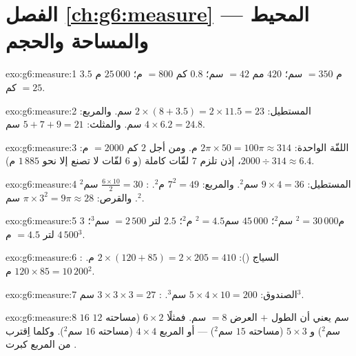 \section*{الفصل \ref{ch:g6:measure} --- المحيط والمساحة والحجم}

\begin{solution}{exo:g6:measure:1}
$3.5$ م $= 350$ سم؛ \quad $420$ مم $= 42$ سم؛ \quad
$0.8$ كم $= 800$ م؛ \quad $25\,000$ م $= 25$ كم.
\end{solution}

\begin{solution}{exo:g6:measure:2}
المستطيل: $2 \times (8 + 3.5) = 2 \times 11.5 = 23$ سم.
والمربع: $4 \times 6.2 = 24.8$ سم.
والمثلث: $5 + 7 + 9 = 21$ سم.
\end{solution}

\begin{solution}{exo:g6:measure:3}
اللفّة الواحدة: $2\pi \times 50 = 100\pi \approx 314$ م. ومن أجل $2$ كم
$= 2000$ م: $2000 \div 314 \approx 6.4$، إذن تلزم $7$ لفّات كاملة
(و $6$ لفّات لا تصنع إلا نحو $1\,885$ م).
\end{solution}

\begin{solution}{exo:g6:measure:4}
المستطيل: $9 \times 4 = 36$ سم$^2$. والمربع: $7^2 = 49$ م$^2$.
: $\frac{6 \times 10}{2} = 30$ سم$^2$.
والقرص: $\pi \times 3^2 = 9\pi \approx 28$ سم$^2$.
\end{solution}

\begin{solution}{exo:g6:measure:5}
$3$ م$^2 = 30\,000$ سم$^2$؛ \quad
$45\,000$ سم$^2 = 4.5$ م$^2$؛ \quad
$2.5$ لتر $= 2\,500$ سم$^3$؛ \quad
$4\,500$ لتر $= 4.5$ م$^3$.
\end{solution}

\begin{solution}{exo:g6:measure:6}
السياج (): $2 \times (120 + 85) = 2 \times 205 = 410$ م.
: $120 \times 85 = 10\,200$ م$^2$.
\end{solution}

\begin{solution}{exo:g6:measure:7}
الصندوق: $5 \times 4 \times 10 = 200$ سم$^3$. :
$3 \times 3 \times 3 = 27$ سم$^3$.
\end{solution}

\begin{solution}{exo:g6:measure:8}
 $16$ سم يعني أن الطول $+$ العرض $= 8$ سم. فمثلًا
$6 \times 2$ (مساحته $12$ سم$^2$) و $5 \times 3$ (مساحته $15$ سم$^2$)
--- أو المربع $4 \times 4$ (مساحته $16$ سم$^2$). وكلما اِقترب من
المربع كبرت .
\end{solution}


